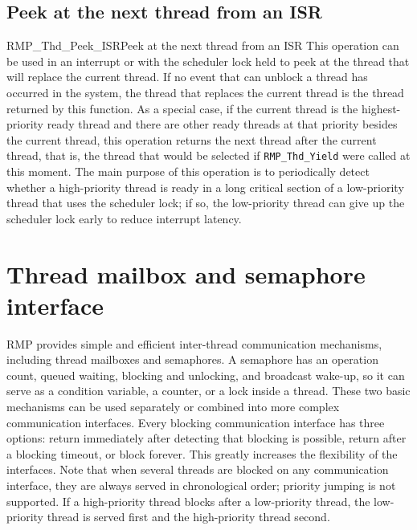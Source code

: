 \subsection{Peek at the next thread from an ISR}
\begin{apidesc}{RMP\_Thd\_Peek\_ISR}{Peek at the next thread from an ISR}\label{api:RMP_Thd_Peek_ISR}
    This operation can be used in an interrupt or with the scheduler lock held to peek at the thread that will replace the current thread.
    If no event that can unblock a thread has occurred in the system, the thread that replaces the current thread is the thread returned by this function.
    As a special case, if the current thread is the highest-priority ready thread and there are other ready threads at that priority besides the current thread, this operation returns the next thread after the current thread, that is, the thread that would be selected if \texttt{RMP\_Thd\_Yield} were called at this moment.
    The main purpose of this operation is to periodically detect whether a high-priority thread is ready in a long critical section of a low-priority thread that uses the scheduler lock; if so, the low-priority thread can give up the scheduler lock early to reduce interrupt latency.
    \begin{apiparams}
    \end{apiparams}
    \begin{apiret}
    \end{apiret}
\end{apidesc}

\section{Thread mailbox and semaphore interface}

RMP provides simple and efficient inter-thread communication mechanisms, including thread mailboxes and semaphores.
A semaphore has an operation count, queued waiting, blocking and unlocking, and broadcast wake-up, so it can serve as a condition variable, a counter, or a lock inside a thread.
These two basic mechanisms can be used separately or combined into more complex communication interfaces.
Every blocking communication interface has three options: return immediately after detecting that blocking is possible, return after a blocking timeout, or block forever.
This greatly increases the flexibility of the interfaces.
Note that when several threads are blocked on any communication interface, they are always served in chronological order; priority jumping is not supported.
If a high-priority thread blocks after a low-priority thread, the low-priority thread is served first and the high-priority thread second.

